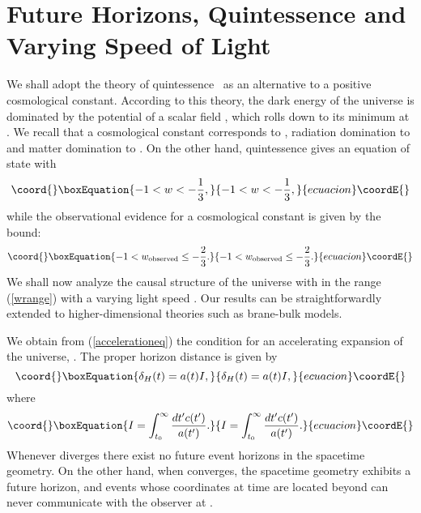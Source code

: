\documentclass[a4paper,12pt]{article}
\begin{document}
\section{\bf Future Horizons, Quintessence and Varying Speed of Light}

We shall adopt the theory of quintessence~\cite{Peebles} as an
alternative to a positive cosmological constant. According to this
theory, the dark energy of the universe is dominated by the potential
\coordHE{} of a scalar field \myHighlight{$\phi$}\coordHE{}, which rolls down to its minimum at
\coordHE{}. We recall that a cosmological constant corresponds to \coordHE{},
radiation domination to \coordHE{} and matter domination to \coordHE{}. On
the other hand, quintessence gives an equation of state with
\begin{equation}\coord{}\boxEquation{
\label{wrange} -1 < w < -\frac{1}{3},
}{
-1 < w < -\frac{1}{3},
}{ecuacion}\coordE{}\end{equation} while
the observational evidence for a cosmological constant is given by the
bound:
\begin{equation}\coord{}\boxEquation{
-1 < w_{\rm observed} \leq -\frac{2}{3}.
}{
-1 < w_{\rm observed} \leq -\frac{2}{3}.
}{ecuacion}\coordE{}\end{equation}
We shall now analyze the causal structure of the universe
with \coordHE{} in the range (\ref{wrange}) with a varying light speed \coordHE{}.
Our results can be straightforwardly extended to higher-dimensional
theories such as brane-bulk models.

We obtain from (\ref{accelerationeq}) the
condition for an accelerating expansion of the universe, \coordHE{}. The
proper horizon distance is given by
\begin{equation}\coord{}\boxEquation{
\delta_H(t)=a(t)I,
}{
\delta_H(t)=a(t)I,
}{ecuacion}\coordE{}\end{equation}
where
\begin{equation}\coord{}\boxEquation{
I=\int^\infty_{t_0}\frac{dt'c(t')}{a(t')}.
}{
I=\int^\infty_{t_0}\frac{dt'c(t')}{a(t')}.
}{ecuacion}\coordE{}\end{equation}
Whenever \coordHE{} diverges there exist no future event horizons
in the spacetime geometry. On the other hand, when \coordHE{} converges, the
spacetime geometry exhibits a future horizon, and events whose coordinates
at time \coordHE{} are located beyond \coordHE{} can never communicate with
the observer at \coordHE{}.
\end{document}
